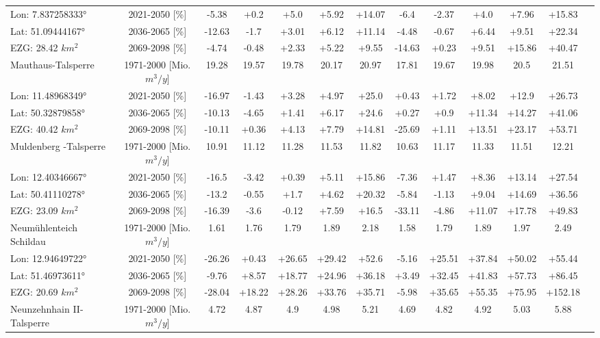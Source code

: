 \begin{longtable}{@{\extracolsep{\fill}}lc|ccccc||cccccc}
\cline{2-13} 
Lon: 7.837258333° & 2021-2050 [\%]  & -5.38 & +0.2 & +5.0 & +5.92 & +14.07 & -6.4 & -2.37 & +4.0 & +7.96 & +15.83 & \\ 
Lat: 51.09444167° & 2036-2065 [\%]  & -12.63 & -1.7 & +3.01 & +6.12 & +11.14 & -4.48 & -0.67 & +6.44 & +9.51 & +22.34 & \\ 
EZG: 28.42 $km^2$ & 2069-2098 [\%]  & -4.74 & -0.48 & +2.33 & +5.22 & +9.55 & -14.63 & +0.23 & +9.51 & +15.86 & +40.47 & \\ 
\hline 
Mauthaus-Talsperre & 1971-2000 [Mio. $m^3/y$]  & 19.28 & 19.57 & 19.78 & 20.17 & 20.97 & 17.81 & 19.67 & 19.98 & 20.5 & 21.51 & \\ 
\cline{2-13} 
Lon: 11.48968349° & 2021-2050 [\%]  & -16.97 & -1.43 & +3.28 & +4.97 & +25.0 & +0.43 & +1.72 & +8.02 & +12.9 & +26.73 & \\ 
Lat: 50.32879858° & 2036-2065 [\%]  & -10.13 & -4.65 & +1.41 & +6.17 & +24.6 & +0.27 & +0.9 & +11.34 & +14.27 & +41.06 & \\ 
EZG: 40.42 $km^2$ & 2069-2098 [\%]  & -10.11 & +0.36 & +4.13 & +7.79 & +14.81 & -25.69 & +1.11 & +13.51 & +23.17 & +53.71 & \\ 
\hline 
Muldenberg -Talsperre & 1971-2000 [Mio. $m^3/y$]  & 10.91 & 11.12 & 11.28 & 11.53 & 11.82 & 10.63 & 11.17 & 11.33 & 11.51 & 12.21 & \\ 
\cline{2-13} 
Lon: 12.40346667° & 2021-2050 [\%]  & -16.5 & -3.42 & +0.39 & +5.11 & +15.86 & -7.36 & +1.47 & +8.36 & +13.14 & +27.54 & \\ 
Lat: 50.41110278° & 2036-2065 [\%]  & -13.2 & -0.55 & +1.7 & +4.62 & +20.32 & -5.84 & -1.13 & +9.04 & +14.69 & +36.56 & \\ 
EZG: 23.09 $km^2$ & 2069-2098 [\%]  & -16.39 & -3.6 & -0.12 & +7.59 & +16.5 & -33.11 & -4.86 & +11.07 & +17.78 & +49.83 & \\ 
\hline 
Neumühlenteich Schildau & 1971-2000 [Mio. $m^3/y$]  & 1.61 & 1.76 & 1.79 & 1.89 & 2.18 & 1.58 & 1.79 & 1.89 & 1.97 & 2.49 & \\ 
\cline{2-13} 
Lon: 12.94649722° & 2021-2050 [\%]  & -26.26 & +0.43 & +26.65 & +29.42 & +52.6 & -5.16 & +25.51 & +37.84 & +50.02 & +55.44 & \\ 
Lat: 51.46973611° & 2036-2065 [\%]  & -9.76 & +8.57 & +18.77 & +24.96 & +36.18 & +3.49 & +32.45 & +41.83 & +57.73 & +86.45 & \\ 
EZG: 20.69 $km^2$ & 2069-2098 [\%]  & -28.04 & +18.22 & +28.26 & +33.76 & +35.71 & -5.98 & +35.65 & +55.35 & +75.95 & +152.18 & \\ 
\hline 
Neunzehnhain II-Talsperre & 1971-2000 [Mio. $m^3/y$]  & 4.72 & 4.87 & 4.9 & 4.98 & 5.21 & 4.69 & 4.82 & 4.92 & 5.03 & 5.88 & \\ 

\end{longtable}
